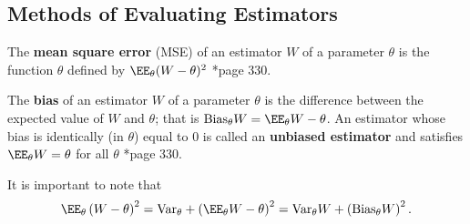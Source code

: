 \subsection*{Methods of Evaluating Estimators}

\begin{defe} \label{defe: mse}
    The {\bf mean square error} (MSE) of an estimator $W$ of a parameter $\theta$ is the function $\theta$ defined by $\EE_{\theta} (W - \theta)^2$ \cite{CasellaGeorge2001SI}*{page 330}.
\end{defe}

\begin{defe}[Bias] \label{defe: bias}
    The {\bf bias} of an estimator $W$ of a parameter $\theta$ is the difference between the expected value of $W$ and $\theta$; that is $\Bias_{\theta} W = \EE_{\theta} W - \theta$. An estimator whose bias is identically (in $\theta$) equal to $0$ is called an {\bf unbiased estimator} and satisfies $\EE_{\theta} W = \theta$ for all $\theta$ \cite{CasellaGeorge2001SI}*{page 330}.
\end{defe}

It is important to note that
\begin{equation*}
    \EE_{\theta} \left( W - \theta \right)^{2} = \Var_{\theta} + \left( \EE_{\theta} W - \theta \right)^2 = \Var_{\theta} W + \left( \Bias_{\theta} W \right)^2 .
\end{equation*}

